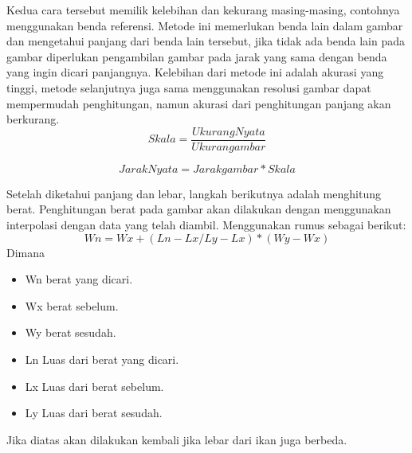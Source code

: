     Kedua cara tersebut memilik kelebihan dan kekurang masing-masing, contohnya menggunakan benda referensi.
 Metode ini memerlukan benda lain dalam gambar dan mengetahui panjang dari benda lain tersebut, jika tidak ada benda lain pada gambar diperlukan pengambilan gambar pada jarak yang sama dengan benda yang ingin dicari panjangnya.
 Kelebihan dari metode ini adalah akurasi yang tinggi, metode selanjutnya juga sama menggunakan resolusi gambar dapat mempermudah penghitungan, namun akurasi dari penghitungan panjang akan berkurang.
\begin{equation*}
    Skala = \frac{Ukurang Nyata}{Ukuran gambar}
\end{equation*}

\begin{equation}
    Jarak Nyata = Jarak gambar * Skala
\end{equation}

    Setelah diketahui panjang dan lebar, langkah berikutnya adalah menghitung berat. Penghitungan berat pada gambar akan dilakukan dengan menggunakan interpolasi dengan data yang telah diambil. Menggunakan rumus sebagai berikut:
\begin{equation}
    Wn = Wx + (Ln - Lx / Ly - Lx) * (Wy - Wx)
\end{equation}
Dimana 
\begin{itemize} 
    \item Wn berat yang dicari.
    \item Wx berat sebelum.
    \item Wy berat sesudah.
    \item Ln Luas dari berat yang dicari.
    \item Lx Luas dari berat sebelum.
    \item Ly Luas dari berat sesudah.
\end{itemize}
    Jika diatas akan dilakukan kembali jika lebar dari ikan juga berbeda.


